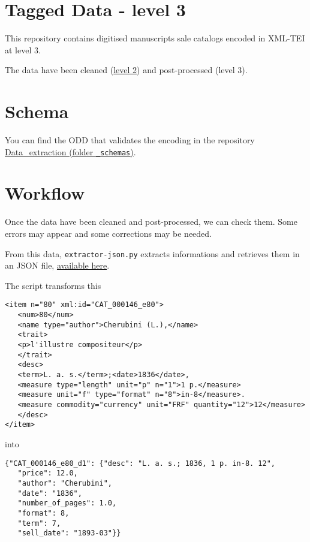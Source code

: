 \section*{Tagged Data - level 3}

This repository contains digitised manuscripts sale catalogs encoded in XML-TEI at level 3.

The data have been cleaned (\href{https://github.com/katabase/2\_CleanedData}{level 2}) and post-processed (level 3).
\section*{Schema}

You can find the ODD that validates the encoding in the repository \href{https://github.com/katabase/Data\_extraction/tree/master/\_schemas}{Data\_extraction (folder \texttt{\_schemas})}.
\section*{Workflow}

Once the data have been cleaned and post-processed, we can check them. Some errors may appear and some corrections may be needed. 

From this data, \texttt{extractor-json.py} extracts informations and retrieves them in an JSON file, \href{https://github.com/katabase/3\_TaggedData/tree/main/output}{available here}.

The script transforms this 

\begin{listing}[h!]
   \begin{verbatim}
<item n="80" xml:id="CAT_000146_e80">
   <num>80</num>
   <name type="author">Cherubini (L.),</name>
   <trait>
   <p>l'illustre compositeur</p>
   </trait>
   <desc>
   <term>L. a. s.</term>;<date>1836</date>,
   <measure type="length" unit="p" n="1">1 p.</measure> 
   <measure unit="f" type="format" n="8">in-8</measure>.
   <measure commodity="currency" unit="FRF" quantity="12">12</measure>
   </desc>
</item>

   \end{verbatim}
\end{listing}

into 

\begin{listing}[h!]
   \begin{verbatim}
{"CAT_000146_e80_d1": {"desc": "L. a. s.; 1836, 1 p. in-8. 12",
   "price": 12.0,
   "author": "Cherubini",
   "date": "1836",
   "number_of_pages": 1.0,
   "format": 8,
   "term": 7,
   "sell_date": "1893-03"}}

   \end{verbatim}
\end{listing}

